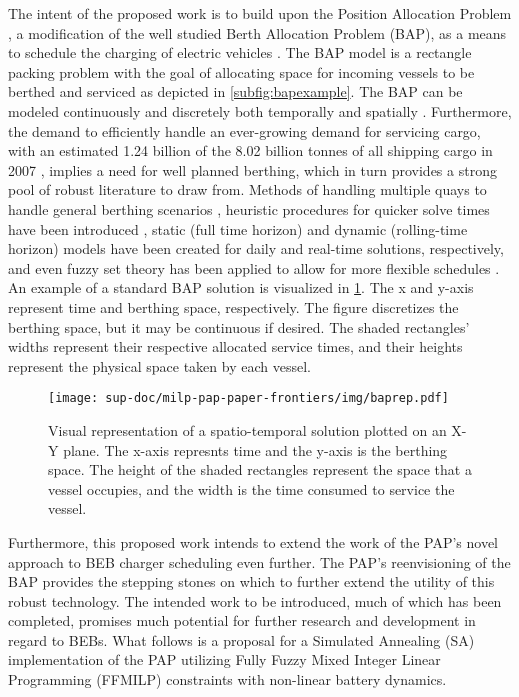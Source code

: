 \documentclass[11pt,a4paper,final]{article}
\begin{document}
The intent of the proposed work is to build upon the Position Allocation Problem \cite{qarebagh-2019-optim-sched}, a
modification of the well studied Berth Allocation Problem (BAP), as a means to schedule the charging of electric
vehicles \cite{buhrkal-2011-model-discr,frojan-2015-contin-berth,imai-2001-dynam-berth}. The BAP model is a rectangle
packing problem with the goal of allocating space for incoming vessels to be berthed and serviced as depicted in
\autoref{subfig:bapexample}. The BAP can be modeled continuously and discretely both temporally and spatially
\cite{buhrkal-2011-model-discr,frojan-2015-contin-berth}. Furthermore, the demand to efficiently handle an
ever-growing demand for servicing cargo, with an estimated 1.24 billion of the 8.02 billion tonnes of all shipping cargo
in 2007 \cite{buhrkal-2011-model-discr}, implies a need for well planned berthing, which in turn provides a strong pool
of robust literature to draw from. Methods of handling multiple quays to handle general berthing scenarios
\cite{frojan-2015-contin-berth,dai-2008-suppl-chain-analy}, heuristic procedures for quicker solve times have been
introduced \cite{imai-2001-dynam-berth}, static (full time horizon) and dynamic (rolling-time horizon) models have been
created for daily and real-time solutions, respectively, and even fuzzy set theory has been applied to allow for more
flexible schedules \cite{bello-2019-fuzzy-activ}. An example of a standard BAP solution is visualized in \ref{img:baprep}.
The x and y-axis represent time and berthing space, respectively. The figure discretizes the berthing space, but it may
be continuous if desired. The shaded rectangles' widths represent their respective allocated service times, and their
heights represent the physical space taken by each vessel.

\begin{figure}[htbp]
\centering
\texttt{[image: sup-doc/milp-pap-paper-frontiers/img/baprep.pdf]}
\caption{\label{img:baprep}Visual representation of a spatio-temporal solution plotted on an X-Y plane. The x-axis represnts time and the y-axis is the berthing space. The height of the shaded rectangles represent the space that a vessel occupies, and the width is the time consumed to service the vessel.}
\end{figure}

Furthermore, this proposed work intends to extend the work of the PAP's novel approach to BEB charger scheduling even
further. The PAP's reenvisioning of the BAP provides the stepping stones on which to further extend the utility of this
robust technology. The intended work to be introduced, much of which has been completed, promises much potential for
further research and development in regard to BEBs. What follows is a proposal for a Simulated Annealing (SA)
implementation of the PAP utilizing Fully Fuzzy Mixed Integer Linear Programming (FFMILP) constraints with non-linear
battery dynamics.
\end{document}
